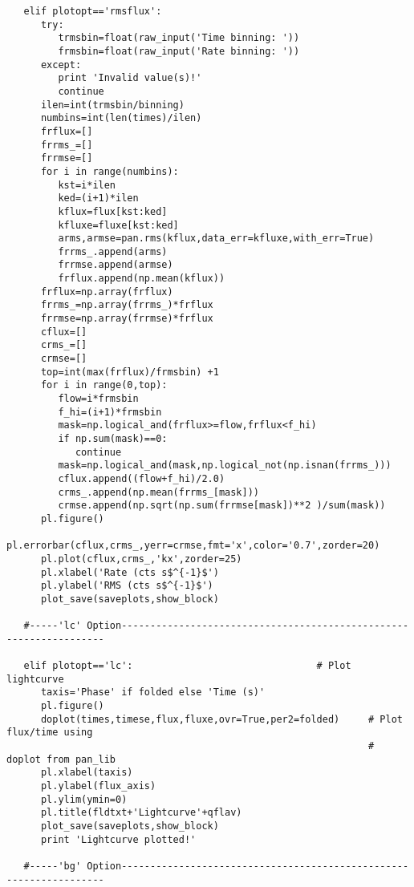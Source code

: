 \begin{verbatim}
   elif plotopt=='rmsflux':
      try:
         trmsbin=float(raw_input('Time binning: '))
         frmsbin=float(raw_input('Rate binning: '))
      except:
         print 'Invalid value(s)!'
         continue
      ilen=int(trmsbin/binning)
      numbins=int(len(times)/ilen)
      frflux=[]
      frrms_=[]
      frrmse=[]
      for i in range(numbins):
         kst=i*ilen
         ked=(i+1)*ilen
         kflux=flux[kst:ked]
         kfluxe=fluxe[kst:ked]
         arms,armse=pan.rms(kflux,data_err=kfluxe,with_err=True)
         frrms_.append(arms)
         frrmse.append(armse)
         frflux.append(np.mean(kflux))
      frflux=np.array(frflux)
      frrms_=np.array(frrms_)*frflux
      frrmse=np.array(frrmse)*frflux
      cflux=[]
      crms_=[]
      crmse=[]
      top=int(max(frflux)/frmsbin) +1
      for i in range(0,top):
         flow=i*frmsbin
         f_hi=(i+1)*frmsbin
         mask=np.logical_and(frflux>=flow,frflux<f_hi)
         if np.sum(mask)==0:
            continue
         mask=np.logical_and(mask,np.logical_not(np.isnan(frrms_)))
         cflux.append((flow+f_hi)/2.0)
         crms_.append(np.mean(frrms_[mask]))
         crmse.append(np.sqrt(np.sum(frrmse[mask])**2 )/sum(mask))
      pl.figure()      
      pl.errorbar(cflux,crms_,yerr=crmse,fmt='x',color='0.7',zorder=20)
      pl.plot(cflux,crms_,'kx',zorder=25)
      pl.xlabel('Rate (cts s$^{-1}$')
      pl.ylabel('RMS (cts s$^{-1}$')
      plot_save(saveplots,show_block) 

   #-----'lc' Option-------------------------------------------------------------------

   elif plotopt=='lc':                                # Plot lightcurve
      taxis='Phase' if folded else 'Time (s)'
      pl.figure()
      doplot(times,timese,flux,fluxe,ovr=True,per2=folded)     # Plot flux/time using
                                                               # doplot from pan_lib
      pl.xlabel(taxis)
      pl.ylabel(flux_axis)
      pl.ylim(ymin=0)
      pl.title(fldtxt+'Lightcurve'+qflav)
      plot_save(saveplots,show_block)
      print 'Lightcurve plotted!'

   #-----'bg' Option-------------------------------------------------------------------


\end{verbatim}
